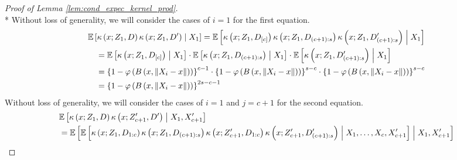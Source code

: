 \begin{proof}[Proof of Lemma \ref{lem:cond_expec_kernel_prod}]\mbox{}\\*
    Without loss of generality, we will consider the cases of $i = 1$ for the first equation.
    \begin{equation}
        \begin{aligned}
            & \mathbb{E}\left[\kappa\left(x; Z_{1}, D\right)\kappa\left(x; Z_{1}, D^{\prime}\right) \; \middle| \; X_1\right]
            = \mathbb{E}\left[\kappa\left(x; Z_{1}, D_{[c]}\right)
            \kappa\left(x; Z_{1}, D_{(c+1):s}\right)
            \kappa\left(x; Z_{1}, D^{\prime}_{(c+1):s}\right) 
            \; \middle| \; X_1\right] \\
            & \quad = \mathbb{E}\left[\kappa\left(x; Z_{1}, D_{[c]}\right)\; \middle| \; X_1\right]
            \cdot \mathbb{E}\left[\kappa\left(x; Z_{1}, D_{(c+1):s}\right)\; \middle| \; X_1\right]
            \cdot \mathbb{E}\left[\kappa\left(x; Z_{1}, D_{(c+1):s}^{\prime}\right)\; \middle| \; X_1\right]\\
            & \quad = \left\{1-\varphi\left(B\left(x,\left\|X_{i}-x\right\|\right)\right)\right\}^{c-1}
            \cdot \left\{1-\varphi\left(B\left(x,\left\|X_{i}-x\right\|\right)\right)\right\}^{s-c}
            \cdot \left\{1-\varphi\left(B\left(x,\left\|X_{i}-x\right\|\right)\right)\right\}^{s-c} \\
            & \quad = \left\{1-\varphi\left(B\left(x,\left\|X_{i}-x\right\|\right)\right)\right\}^{2s-c-1}
        \end{aligned}
    \end{equation}
    Without loss of generality, we will consider the cases of $i = 1$ and $j = c + 1$ for the second equation.
    \begin{equation}
    \begin{aligned}
        & \E\left[\kappa\left(x; Z_{1}, D\right)\kappa\left(x; Z_{c+1}^{\prime}, D^{\prime}\right) \; \middle| \; X_1, X_{c+1}^{\prime}\right]\\
        & = \E\left[
                \E\left[
                    \kappa\left(x; Z_{1}, D_{1:c}\right)
                    \kappa\left(x; Z_{1}, D_{(c+1):s}\right)
                    \kappa\left(x; Z_{c+1}^{\prime}, D_{1:c}\right) 
                    \kappa\left(x; Z_{c+1}^{\prime}, D^{\prime}_{(c+1):s}\right) 
                \; \middle| \; X_1, \dotsc, X_{c}, X_{c+1}^{\prime}\right] 
            \; \middle| \; X_1, X_{c+1}^{\prime}\right] \\

\end{aligned}
\end{equation}
\end{proof}

